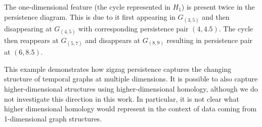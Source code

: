 The one-dimensional feature (the cycle represented in $H_1$) is present twice in the persistence diagram. 
This is due to it first appearing in $G_{(3,5)}$ and then disappearing at $G_{(4,5)}$ with corresponding persistence pair $(4, 4.5)$. 
The cycle then reappears at $G_{(5,7)}$ and disappears at $G_{(8,9)}$ resulting in persistence pair at $(6,8.5)$. 

This example demonstrates how zigzag persistence captures the changing structure of temporal graphs at multiple dimensions. 
It is possible to also capture higher-dimensional structures using higher-dimensional homology, although we do not investigate this direction in this work.
In particular, it is not clear what higher dimensional homology would represent in the context of data coming from 1-dimensional graph structures.


